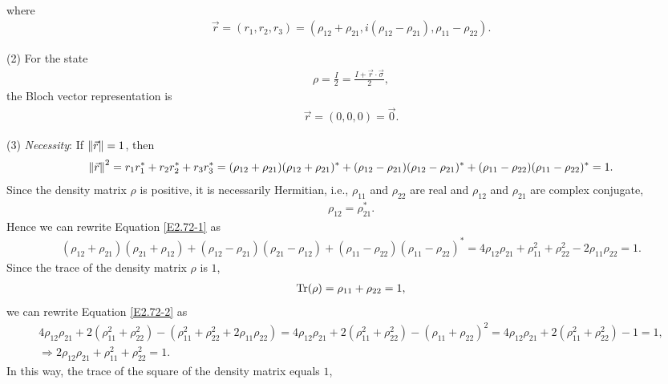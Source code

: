 \documentclass[en]{sol-man}
\begin{document}
\begin{sol}
\begin{align}
    \end{align}
    where
    \begin{align}
        \vec{r}=(r_1,r_2,r_3)=(\rho_{12}+\rho_{21},i(\rho_{12}-\rho_{21}),\rho_{11}-\rho_{22}).
    \end{align}
    \item[(2)] For the state
    \begin{align}
        \rho=\frac{I}{2}=\frac{I+\vec{r}\cdot\vec{\sigma}}{2},
    \end{align}
    the Bloch vector representation is
    \begin{align}
        \vec{r}=(0,0,0)=\vec{0}.
    \end{align}
    \item[(3)] \emph{Necessity}: If $\left\lVert\vec{r}\right\rVert=1$, then
    \begin{align}
        \label{E2.72-1}
        \left\lVert\vec{r}\right\rVert^2=r_1r_1^*+r_2r_2^*+r_3r_3^*=(\rho_{12}+\rho_{21})(\rho_{12}+\rho_{21})^*+(\rho_{12}-\rho_{21})(\rho_{12}-\rho_{21})^*+(\rho_{11}-\rho_{22})(\rho_{11}-\rho_{22})^*=1.
    \end{align}
    Since the density matrix $\rho$ is positive, it is necessarily Hermitian, i.e., $\rho_{11}$ and $\rho_{22}$ are real and $\rho_{12}$ and $\rho_{21}$ are complex conjugate,
    \begin{align}
        \rho_{12}=\rho_{21}^*.
    \end{align}
    Hence we can rewrite Equation \eqref{E2.72-1} as
    \begin{align}
        \label{E2.72-2}
        (\rho_{12}+\rho_{21})(\rho_{21}+\rho_{12})+(\rho_{12}-\rho_{21})(\rho_{21}-\rho_{12})+(\rho_{11}-\rho_{22})(\rho_{11}-\rho_{22})^*=4\rho_{12}\rho_{21}+\rho_{11}^2+\rho_{22}^2-2\rho_{11}\rho_{22}=1.
    \end{align}
    Since the trace of the density matrix $\rho$ is $1$,
    \begin{align}
        \operatorname{Tr}(\rho)=\rho_{11}+\rho_{22}=1,
    \end{align}
    we can rewrite Equation \eqref{E2.72-2} as
    \begin{gather}
        4\rho_{12}\rho_{21}+2(\rho_{11}^2+\rho_{22}^2)-(\rho_{11}^2+\rho_{22}^2+2\rho_{11}\rho_{22})=4\rho_{12}\rho_{21}+2(\rho_{11}^2+\rho_{22}^2)-(\rho_{11}+\rho_{22})^2=4\rho_{12}\rho_{21}+2(\rho_{11}^2+\rho_{22}^2)-1=1,\\
        \Longrightarrow 2\rho_{12}\rho_{21}+\rho_{11}^2+\rho_{22}^2=1.
    \end{gather}
    In this way, the trace of the square of the density matrix equals $1$,

\end{sol}
\end{document}
